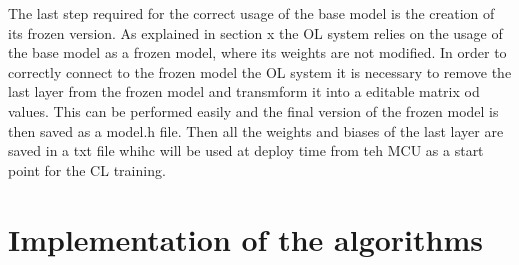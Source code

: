 \documentclass[12pt]{report}
\begin{document}

The last step required for the correct usage of the base model is the creation of its frozen version. As explained in section x the OL system relies on the usage of the base model as a frozen model, where its weights are not modified. In order to correctly connect to the frozen model the OL system it is necessary to remove the last layer from the frozen model and transmform it into a editable matrix od values. This can be performed easily and the final version of the frozen model is then saved as a model.h file. Then all the weights and biases of the last layer are saved in a txt file whihc will be used at deploy time from teh MCU as a start point for the CL training.  

\section{Implementation of the algorithms}
\end{document}
